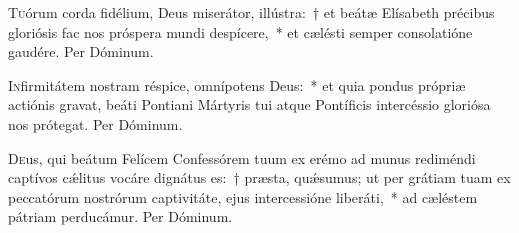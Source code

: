 \documentclass[vesperale_romanum]{subfiles}
\begin{document}
\duplexmajus






\myrule

\newpage
{}

\duplex

\oratio

\lettrine{T}{u}órum corda fidélium, Deus miserátor, illústra:~† et beátæ Elísabeth précibus gloriósis fac nos próspera mundi despícere,~* et cælésti semper consolatióne gaudére. Per Dóminum.


\oratio

\lettrine{I}{n}firmitátem nostram réspice, omnípotens Deus:~* et quia pondus própriæ actiónis gravat, beáti Pontiani Mártyris tui atque Pontíficis intercéssio gloriósa nos prótegat.
Per Dóminum.

\capitdeseq

\myrule


\duplexmtv

\oratio

\lettrine{D}{e}us, qui beátum Felícem Confessórem tuum ex erémo ad munus rediméndi captívos cǽlitus vocáre dignátus es:~† præsta, quǽsumus; ut per grátiam tuam ex peccatórum nostrórum captivitáte, ejus intercessióne liberáti,~* ad cæléstem pátriam perducámur. Per Dóminum.


\vespsequentiscomm

\myrule
{}

\duplexmajus
\end{document}
